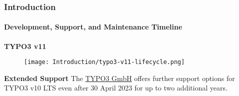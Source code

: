 %

\begin{frame}[fragile]
	\frametitle{Introduction}
	\framesubtitle{Development, Support, and Maintenance Timeline}

	\textbf{TYPO3 v11}

	\begin{figure}
		\texttt{[image: Introduction/typo3-v11-lifecycle.png]}
	\end{figure}

	\textbf{Extended Support}\newline
	\smaller
		The \href{https://typo3.com}{TYPO3 GmbH} offers further support options
		for TYPO3 v10 LTS even after 30 April 2023 for up to two additional
		years.
	\normalsize

\end{frame}

